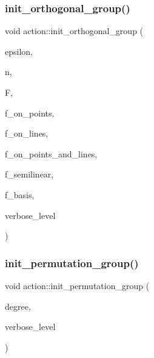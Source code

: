 \subsubsection{\texorpdfstring{init\+\_\+orthogonal\+\_\+group()}{init\_orthogonal\_group()}}
{\footnotesize\ttfamily void action\+::init\+\_\+orthogonal\+\_\+group (\begin{DoxyParamCaption}\item[{\mbox{\hyperlink{galois_8h_a09fddde158a3a20bd2dcadb609de11dc}{I\+NT}}}]{epsilon,  }\item[{\mbox{\hyperlink{galois_8h_a09fddde158a3a20bd2dcadb609de11dc}{I\+NT}}}]{n,  }\item[{\mbox{\hyperlink{classfinite__field}{finite\+\_\+field}} $\ast$}]{F,  }\item[{\mbox{\hyperlink{galois_8h_a09fddde158a3a20bd2dcadb609de11dc}{I\+NT}}}]{f\+\_\+on\+\_\+points,  }\item[{\mbox{\hyperlink{galois_8h_a09fddde158a3a20bd2dcadb609de11dc}{I\+NT}}}]{f\+\_\+on\+\_\+lines,  }\item[{\mbox{\hyperlink{galois_8h_a09fddde158a3a20bd2dcadb609de11dc}{I\+NT}}}]{f\+\_\+on\+\_\+points\+\_\+and\+\_\+lines,  }\item[{\mbox{\hyperlink{galois_8h_a09fddde158a3a20bd2dcadb609de11dc}{I\+NT}}}]{f\+\_\+semilinear,  }\item[{\mbox{\hyperlink{galois_8h_a09fddde158a3a20bd2dcadb609de11dc}{I\+NT}}}]{f\+\_\+basis,  }\item[{\mbox{\hyperlink{galois_8h_a09fddde158a3a20bd2dcadb609de11dc}{I\+NT}}}]{verbose\+\_\+level }\end{DoxyParamCaption})}

\mbox{\label{classaction_a339bbfc596572ec88071c5f5e0ce3f41}} 
\subsubsection{\texorpdfstring{init\+\_\+permutation\+\_\+group()}{init\_permutation\_group()}}
{\footnotesize\ttfamily void action\+::init\+\_\+permutation\+\_\+group (\begin{DoxyParamCaption}\item[{\mbox{\hyperlink{galois_8h_a09fddde158a3a20bd2dcadb609de11dc}{I\+NT}}}]{degree,  }\item[{\mbox{\hyperlink{galois_8h_a09fddde158a3a20bd2dcadb609de11dc}{I\+NT}}}]{verbose\+\_\+level }\end{DoxyParamCaption})}

